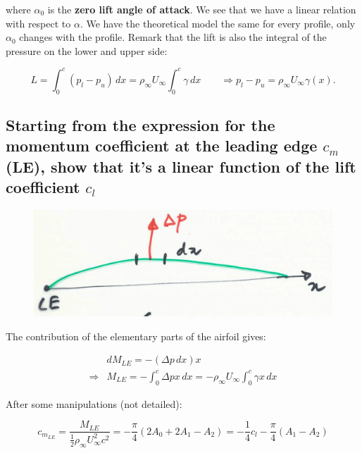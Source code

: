 \documentclass[british,french,11pt, a4paper, openany]{article}
\begin{document}
where $\alpha _0$ is the \textbf{zero lift angle of attack}. We see that we have a linear relation with respect to $\alpha$. We have the theoretical model the same for every profile, only $\alpha _0$ changes with the profile. Remark that the lift is also the integral of the pressure on the lower and upper side:

\begin{equation}
L = \int _0 ^c (p_l - p_u) \, dx = \rho _\infty U_\infty \int _0 ^c \gamma \, dx \qquad \Rightarrow p_l - p_u = \rho _\infty U_\infty \gamma (x).
\end{equation}

\subsection{Starting from the expression for the momentum coefficient at the leading
	edge $c_m$(LE), show that it’s a linear function of the lift coefficient $c_l$}


\begin{figure}
	\vspace{-5mm}
	\includegraphics[scale=0.1]{ch2/34}
\end{figure}
The contribution of the elementary parts of the airfoil gives:

\begin{equation}
\begin{aligned}
&dM_{LE} = - (\Delta p \, dx) x \\ 
\Rightarrow &M_{LE} = -\int _0 ^c \Delta p x \, dx = - \rho _\infty U_\infty \int _0^c \gamma x \, dx
\end{aligned}
\end{equation}

After some manipulations (not detailed):

\begin{equation}
c_{m_{LE}} = \frac{M_{LE}}{\frac{1}{2}\rho _\infty U_\infty ^2 c^2} = - \frac{\pi}{4} (2A_0 + 2A_1 - A_2) = -\frac{1}{4} c_l - \frac{\pi}{4} (A_1 - A_2)
\end{equation}
\end{document}
